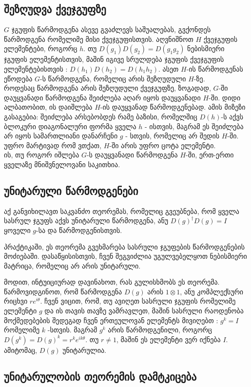 \documentclass[12pt]{article}
\begin{document}
\begin{sloppypar}
\subsection{შეზღუდვა ქვეჯგუფზე}

$G$ ჯგუფის წარმოდგენა ასევე გვაძლევს საშუალებას, გვქონდეს წარმოდგენა რომელიმე მისი ქვეჯგუფისთვის. აღვნიშნოთ $H$ ქვეჯგუფის ელემენტები, როგორც $h$. თუ $D(g_1)D(g_2) = D(g_1 g_2)$ ნებისმიერი ჯგუფის ელემენტისთვის, მაშინ იგივე სრულდება ჯგუფის ქვეჯგუფის ელემენტებისთვის : $D(h_1)D(h_2) = D(h_1 h_2)$. ასეთ $H$-ის წარმოდგენას ეწოდება $G$-ს წარმოდგენა, რომელიც არის შეზღუდული $H$-ზე.\\

როდესაც წარმოდგენა არის შეზღუდული ქვეჯგუფზე, ზოგადად, $G$-ში დაუყვანადი წარმოდგენა შეიძლება აღარ იყოს დაუყვანადი $H$-ში. დიდი ალბათობით, ის დაიშლება $H$-ის დაუყვანად წარმოდგენებად. ამის მიზეზი გასაგებია: შეიძლება არსებობდეს რამე ბაზისი, რომელშიც $D(h)$-ს აქვს ბლოკური დიაგონალური ფორმა ყველა $h$ - ისთვის, მაგრამ ეს შეიძლება არ იყოს სამართლიანი დანარჩენი $g$ - სთვის, რომელიც არ შედის $H$-ში. უფრო მარტივად რომ ვთქათ, $H$-ში არის უფრო ცოტა ელემენტი.\\

ის, თუ როგორ იშლება $G$-ს დაუყვანადი წარმოდგენა $H$-ში, ერთ-ერთი ყველაზე მნიშვნელოვანი საკითხია.

\subsection{უნიტარული წარმოდგენები}

აქ განვიხილავთ საკვანძო თეორემას, რომელიც გვეუბნება, რომ ყველა სასრულ ჯგუფს აქვს უნიტარული წარმოდგენა, ანუ $D(g)^{\dagger}D(g)=I$ ყოველი $g$-სა და წარმოდგენისთვის.

პრაქტიკაში, ეს თეორემა გვეხმარება სასრული ჯგუფების წარმოდგენების მოძიებაში. დასაწყისისთვის, ჩვენ შეგვიძლია უგულვებელყოთ ნებისმიერი მატრიცა, რომელიც არ არის უნიტარული.

მოდით, ინტუიციურად დავინახოთ, რას გულისხმობს ეს თეორემა. წარმოვიდგინოთ, რომ წარმოდგენა $D(g)$ არის $1\otimes 1$, ანუ კომპლექსური რიცხვი $re^{i\theta}$. ჩვენ ვიცით, რომ, თუ ავიღეთ სასრული ჯგუფის რომელიმე ელემენტი $g$ და ის თავის თავზე ვამრავლეთ, მაშინ სასრული რაოდენობა მოქმედებების შედეგად ჩვენ ერთეულოვან ელემენტს მივიღებთ : $g^k=I$ რომელიმე $k$ -სთვის. მაგრამ $g^k$ არის წარმოდგენილი, როგორც $D(g^k)= D(g)^k = r^ke^{ik\theta}$. თუ $r \neq 1$, მაშინ ეს ელემენტი ვერ იქნება $I$. ამიტომაც, $D(g)$ უნიტარულია.
 
\subsection{უნიტარულობის თეორემის დამტკიცება}


\end{sloppypar}
\end{document}
